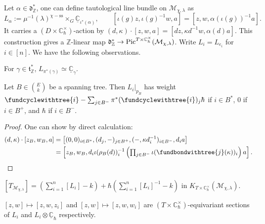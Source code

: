 \documentclass[b5paper]{article}
\newcommand{\MM}{\mathcal{M}}
\newcommand{\sstab}{\mathrm{ss}}
\newcommand{\Chbar}{\mathbb{C}^\times _\hbar}
\begin{document}
Let $\alpha\in \mathfrak{d}^*_\mathbb{Z}$, one can define tautological line bundle on $\MM_{\chi,\lambda}$ as 
\[
    L_\alpha:=\mu^{-1}(\lambda)^{\chi-\sstab}\times_G\underline{\mathbb{C}}_{\iota^*(\alpha)},\qquad 
\left[\iota(g)z,\iota(g)^{-1}w,a\right]=\left[z,w,\alpha(\iota(g))^{-1}a\right].
\]
It carries a $(D\times \Chbar)$-action by $(d,\kappa)\cdot [z,w,a]=\left[dz,\kappa d^{-1}w,\alpha(d)a\right]$.
This construction gives a $\mathbb{Z}$-linear map $\mathfrak{d}^*_\mathbb{Z}\rightarrow \textnormal{Pic}^{T\times \Chbar}(\MM_{\chi,\lambda})$. Write $L_i=L_{e_i}$ for $i\in [n]$.
We have the following observations.
\begin{proposition}[pps:]{}
    For $\gamma\in \mathfrak{t}^*_\mathbb{Z}$, $L_{\pi^*(\gamma)}\simeq \underline{\mathbb{C}}_{\gamma}$.
\end{proposition}

\begin{proposition}{}
  Let $B\in \binom{E}{k}$ be a spanning tree. Then $\left.L_i\right|_{p_B}$ has weight $\fundcyclewithtree{i}-\sum_{j\in B^-}^{}\pi^*(\fundcyclewithtree{i})_j\hbar$ if $i\in B^*$, $0$ if $i\in B^+$, and $\hbar$ if $i\in B^-$.
      \begin{proof}
          One can show by direct calculation:
          \begin{alignat*}{1}
              (d,\kappa)\cdot [z_B,w_B,a]
              &=\left[(0,0)_{i\in B^*}, (d_j,-)_{j\in B^+}, (-,\kappa d_i^{-1})_{i\in B^-}, d_ia\right]\\
              &= \textstyle\left[z_B,w_B,d_i\iota(\rho_B(d))^{-1}_i\left(\prod_{j\in B^-}^{}\iota(\fundbondwithtree{j}(\kappa))_i\right)a\right].
          \end{alignat*}
      \end{proof}
\end{proposition}

\begin{corollary}[crl:]{}
    $[T_{\MM_{\chi,\lambda}}]=\left(\sum_{i=1}^{n}[L_i]-k\right)+\hbar\left(\sum_{i=1}^{n}[L_i]^{-1}-k\right)$ in $K_{T\times \Chbar}(\MM_{\chi,\lambda})$.
\end{corollary}

\begin{proposition}[pps:]{}
    $[z,w]\mapsto [z,w,z_i]$ and $[z,w]\mapsto [z,w,w_i]$ are $(T\times \Chbar)$-equivariant sections of $L_i$ and $L_i\otimes\underline{\mathbb{C}}_{\hbar}$ respectively.
\end{proposition}
\end{document}
